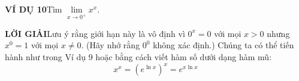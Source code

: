 \begin{minipage}[t]{126mm}
\vspace{0.6em}
\noindent\textbf{\color{stewartblue}VÍ DỤ 10}\hspace{1em}Tìm $\lim\limits_{x \to 0^+} x^x$.

\noindent\textbf{\color{stewartblue}LỜI GIẢI}\hspace{1em}Lưu ý rằng giới hạn này là vô định vì $0^x = 0$ với mọi $x > 0$ nhưng $x^0 = 1$ với mọi $x \neq 0$. (Hãy nhớ rằng $0^0$ không xác định.) Chúng ta có thể tiến hành như trong Ví dụ 9 hoặc bằng cách viết hàm số dưới dạng hàm mũ:
\[
x^x = (e^{\ln x})^x = e^{x \ln x}
\]
\end{minipage}
